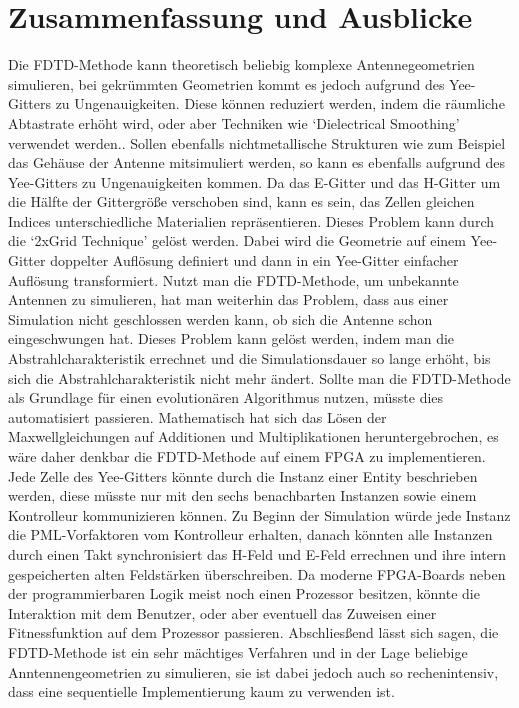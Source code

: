 \documentclass[11pt, ngerman]{article}
\begin{document}
\section{Zusammenfassung und Ausblicke}
Die FDTD-Methode kann theoretisch beliebig komplexe Antennegeometrien simulieren, bei gekr\"ummten Geometrien kommt es jedoch aufgrund
des Yee-Gitters zu Ungenauigkeiten. Diese k\"onnen reduziert werden, indem die r\"aumliche Abtastrate erh\"oht wird, oder aber Techniken
wie `Dielectrical Smoothing' verwendet werden.\cite{dielectrical_smoothing}. Sollen ebenfalls nichtmetallische Strukturen wie
zum Beispiel das Geh\"ause der Antenne mitsimuliert werden, so kann es ebenfalls aufgrund des Yee-Gitters zu
Ungenauigkeiten kommen. Da das E-Gitter und das H-Gitter um die H\"alfte der Gittergr\"o{\ss}e verschoben sind, kann
es sein, das Zellen gleichen Indices unterschiedliche Materialien repr\"asentieren. Dieses Problem kann durch die
`2xGrid Technique' gel\"ost werden. Dabei wird die Geometrie auf einem Yee-Gitter doppelter Aufl\"osung definiert und dann in ein
Yee-Gitter einfacher Aufl\"osung transformiert.
Nutzt man die FDTD-Methode, um unbekannte Antennen zu simulieren, hat man weiterhin das Problem, dass aus einer Simulation
nicht geschlossen werden kann, ob sich die Antenne schon eingeschwungen hat. Dieses Problem kann gel\"ost werden, indem man
die Abstrahlcharakteristik errechnet und die Simulationsdauer so lange erh\"oht, bis sich die Abstrahlcharakteristik nicht
mehr \"andert. Sollte man die FDTD-Methode als Grundlage f\"ur einen evolution\"aren Algorithmus nutzen, m\"usste dies
automatisiert passieren. Mathematisch hat sich das L\"osen der Maxwellgleichungen auf Additionen und Multiplikationen
heruntergebrochen, es w\"are daher denkbar die FDTD-Methode auf einem FPGA zu implementieren.
Jede Zelle des Yee-Gitters k\"onnte durch die Instanz einer Entity beschrieben werden, diese m\"usste nur mit den sechs benachbarten Instanzen sowie einem
Kontrolleur kommunizieren k\"onnen. Zu Beginn der Simulation w\"urde jede Instanz die PML-Vorfaktoren vom Kontrolleur erhalten,
danach k\"onnten alle Instanzen durch einen Takt synchronisiert das H-Feld und E-Feld errechnen und ihre intern gespeicherten
alten Feldst\"arken \"uberschreiben. Da moderne FPGA-Boards neben der programmierbaren Logik meist noch einen Prozessor
besitzen, k\"onnte die Interaktion mit dem Benutzer, oder aber eventuell das Zuweisen einer Fitnessfunktion auf
dem Prozessor passieren. Abschlies{\ss}end l\"asst sich sagen, die FDTD-Methode ist ein sehr m\"achtiges Verfahren und in der Lage beliebige Anntennengeometrien
zu simulieren, sie ist dabei jedoch auch so rechenintensiv, dass eine sequentielle Implementierung kaum zu verwenden ist.

%


\end{document}
